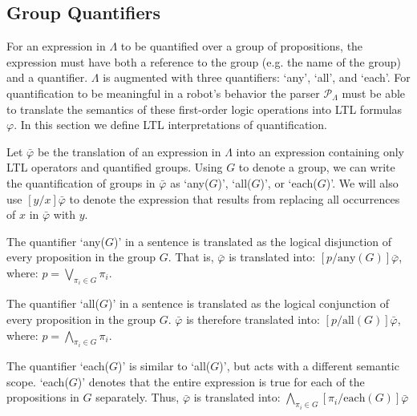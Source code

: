 \subsection{Group Quantifiers}

For an expression in $\Lambda$ to be quantified over a group of propositions, the expression must have both a reference to the group (e.g. the name of the group) and a quantifier. 
$\Lambda$ is augmented with three quantifiers: `any', `all', and `each'. 
For quantification to be meaningful in a robot's behavior the parser $\mathcal{P}_{\Lambda}$ must be able to translate the semantics of these first-order logic operations into LTL formulas $\varphi$.
In this section we define LTL interpretations of quantification. 

Let $\bar{\varphi}$ be the translation of an expression in $\Lambda$ into an expression containing only LTL operators and quantified groups. 
Using $G$ to denote a group, we can write the quantification of groups in $\bar{\varphi}$ as `any($G$)', `all($G$)', or `each($G$)'. 
We will also use $[y/x]\bar{\varphi}$ to denote the expression that results from replacing all occurrences of $x$ in $\bar{\varphi}$ with $y$. 
\par
The quantifier `any($G$)' in a sentence is translated as the logical disjunction of every proposition in the group $G$. 
That is, $\bar{\varphi}$ is translated into: 
$[ p / \text{any}(G)] \bar{\varphi}$, where: $p = \bigvee \limits_{\pi_i \in G} \pi_i$.

The quantifier `all($G$)' in a sentence is translated as the logical conjunction of every proposition in the group $G$. 
$\bar{\varphi}$ is therefore translated into: 
$[ p / \text{all}(G)] \bar{\varphi}$, where: $p = \bigwedge \limits_{\pi_i \in G} \pi_i$.

The quantifier `each($G$)' is similar to `all($G$)', but acts with a different semantic scope. 
`each($G$)' denotes that the entire expression is true for each of the propositions in $G$ separately. 
Thus, $\bar{\varphi}$ is translated into:
$\bigwedge\limits_{\pi_i \in G} [\pi_i / \text{each}(G)] \bar{\varphi}$

